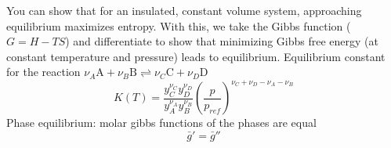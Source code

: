 \documentclass[paper=letter, fontsize=11pt]{scrartcl}
\numberwithin{equation}{section}        %
\numberwithin{figure}{section}          %
\numberwithin{table}{section}               %
\begin{document}
You can show that for an insulated, constant volume system, approaching equilibrium maximizes entropy. With this, we take the Gibbs function ($G = H - TS$) and differentiate to show that minimizing Gibbs free energy (at constant temperature and pressure) leads to equilibrium.
\newline
\newline
Equilibrium constant for the reaction $\nu_A\text{A} + \nu_B\text{B} \rightleftharpoons \nu_C\text{C} + \nu_D\text{D}$
\begin{equation}
    K(T) = \frac{y_C^{\nu_C}y_D^{\nu_D}}{y_A^{\nu_A}y_B^{\nu_B}}\left( \frac{p}{p_{ref}} \right)^{\nu_C+\nu_D-\nu_A-\nu_B}
\end{equation}
\newline
\newline
Phase equilibrium: molar gibbs functions of the phases are equal
\begin{equation}
    \bar g' = \bar g''
\end{equation}

\end{document}
